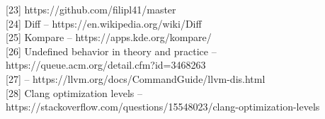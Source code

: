 \documentclass[12pt,oneside]{memoir}
\begin{document}
[23] https://github.com/filipl41/master \\

[24] Diff -- https://en.wikipedia.org/wiki/Diff \\

[25] Kompare -- https://apps.kde.org/kompare/ \\

[26] Undefined behavior in theory and practice -- https://queue.acm.org/detail.cfm?id=3468263 \\

[27] -- https://llvm.org/docs/CommandGuide/llvm-dis.html \\

[28] Clang optimization levels -- https://stackoverflow.com/questions/15548023/clang-optimization-levels
\end{document}
